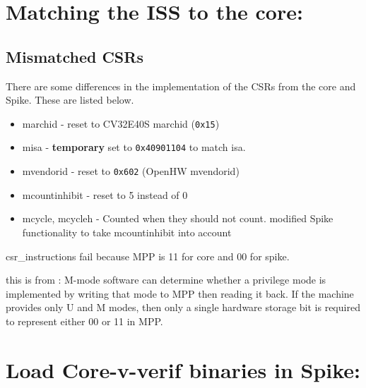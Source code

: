 
\section{Matching the ISS to the core: }

\subsection{Mismatched CSRs}

There are some differences in the implementation of the CSRs from the core and Spike. These are listed below.

\begin{itemize}
    \item marchid - reset to CV32E40S marchid (\lstinline{0x15})
    \item misa - \textbf{temporary} set to \lstinline{0x40901104} to match isa. 
    \item mvendorid  - reset to \lstinline{0x602} (OpenHW mvendorid)
    \item mcountinhibit - reset to 5 instead of 0
    \item mcycle, mcycleh - Counted when they should not count. modified Spike functionality to take mcountinhibit into account
\end{itemize}

csr\_instructions fail because MPP is 11 for core and 00 for spike. 

this is from \cite{watermanRISCVInstructionSet2021}:
M-mode software can determine whether a privilege mode is implemented by writing that mode
to MPP then reading it back.
If the machine provides only U and M modes, then only a single hardware storage bit is
required to represent either 00 or 11 in MPP.




\section{Load Core-v-verif binaries in Spike: }

%

